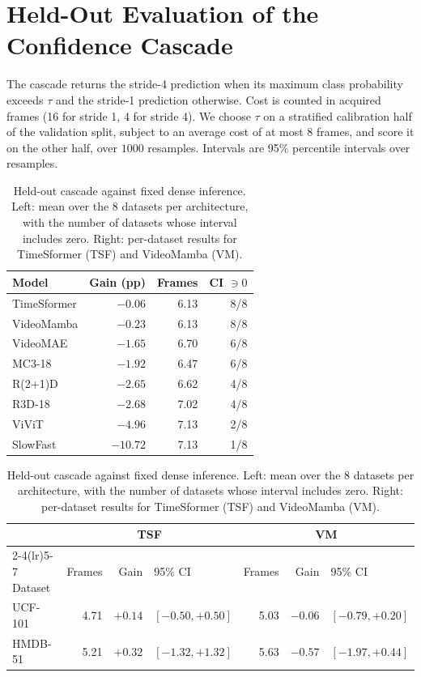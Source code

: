 \documentclass[a4paper, 10pt, conference, onecolumn]{ieeeconf}
\newcommand{\tabtight}{\setlength{\tabcolsep}{3.5pt}\renewcommand{\arraystretch}{1.12}}
\begin{document}
\section{Held-Out Evaluation of the Confidence Cascade}
\label{sec:sup_routing_heldout}

The cascade returns the stride-4 prediction when its maximum class probability
exceeds $\tau$ and the stride-1 prediction otherwise. Cost is counted in
acquired frames (16 for stride 1, 4 for stride 4). We choose $\tau$ on a
stratified calibration half of the validation split, subject to an average cost
of at most 8 frames, and score it on the other half, over $1000$ resamples.
Intervals are 95\% percentile intervals over resamples.

\begin{table}[!htbp]
\centering
\caption{Held-out cascade against fixed dense inference. Left: mean over the 8
datasets per architecture, with the number of datasets whose interval includes
zero. Right: per-dataset results for TimeSformer (TSF) and VideoMamba (VM).}
\label{tab:sup_cascade}
\scriptsize\tabtight
\begin{tabular}{l r r r}
\toprule
Model & Gain (pp) & Frames & CI $\ni0$ \\
\midrule
TimeSformer & $-0.06$  & 6.13 & 8/8 \\
VideoMamba  & $-0.23$  & 6.13 & 8/8 \\
VideoMAE    & $-1.65$  & 6.70 & 6/8 \\
MC3-18      & $-1.92$  & 6.47 & 6/8 \\
R(2+1)D     & $-2.65$  & 6.62 & 4/8 \\
R3D-18      & $-2.68$  & 7.02 & 4/8 \\
ViViT       & $-4.96$  & 7.13 & 2/8 \\
SlowFast    & $-10.72$ & 7.13 & 1/8 \\
\bottomrule
\end{tabular}
\hspace{1.5em}
\begin{tabular}{l r r l r r l}
\toprule
 & \multicolumn{3}{c}{TSF} & \multicolumn{3}{c}{VM} \\
\cmidrule(lr){2-4}\cmidrule(lr){5-7}
Dataset & Frames & Gain & 95\% CI & Frames & Gain & 95\% CI \\
\midrule
UCF-101       & 4.71 & $+0.14$ & $[-0.50,+0.50]$ & 5.03 & $-0.06$ & $[-0.79,+0.20]$ \\
HMDB-51       & 5.21 & $+0.32$ & $[-1.32,+1.32]$ & 5.63 & $-0.57$ & $[-1.97,+0.44]$ \\

\end{tabular}
\end{table}
\end{document}
